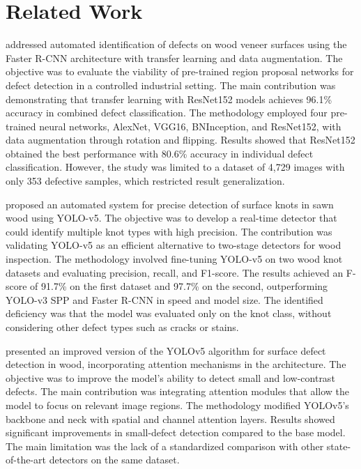 \documentclass[pdflatex,sn-basic,Numbered,iicol]{sn-jnl}
\begin{document}

\section{Related Work}
\label{sec:related}

\citet{urbonas2019automated} addressed automated identification of defects on wood veneer surfaces using the Faster R-CNN architecture with transfer learning and data augmentation. The objective was to evaluate the viability of pre-trained region proposal networks for defect detection in a controlled industrial setting. The main contribution was demonstrating that transfer learning with ResNet152 models achieves 96.1\% accuracy in combined defect classification. The methodology employed four pre-trained neural networks, AlexNet, VGG16, BNInception, and ResNet152, with data augmentation through rotation and flipping. Results showed that ResNet152 obtained the best performance with 80.6\% accuracy in individual defect classification. However, the study was limited to a dataset of 4,729 images with only 353 defective samples, which restricted result generalization.

\citet{fang2021yolov5knots} proposed an automated system for precise detection of surface knots in sawn wood using YOLO-v5. The objective was to develop a real-time detector that could identify multiple knot types with high precision. The contribution was validating YOLO-v5 as an efficient alternative to two-stage detectors for wood inspection. The methodology involved fine-tuning YOLO-v5 on two wood knot datasets and evaluating precision, recall, and F1-score. The results achieved an F-score of 91.7\% on the first dataset and 97.7\% on the second, outperforming YOLO-v3 SPP and Faster R-CNN in speed and model size. The identified deficiency was that the model was evaluated only on the knot class, without considering other defect types such as cracks or stains.

\citet{han2023improved} presented an improved version of the YOLOv5 algorithm for surface defect detection in wood, incorporating attention mechanisms in the architecture. The objective was to improve the model's ability to detect small and low-contrast defects. The main contribution was integrating attention modules that allow the model to focus on relevant image regions. The methodology modified YOLOv5's backbone and neck with spatial and channel attention layers. Results showed significant improvements in small-defect detection compared to the base model. The main limitation was the lack of a standardized comparison with other state-of-the-art detectors on the same dataset.
\end{document}
